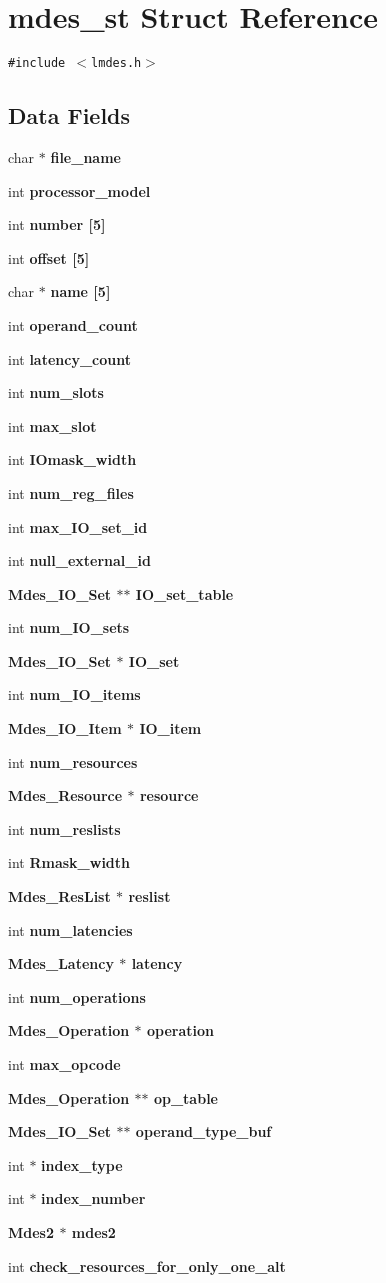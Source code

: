 \section{mdes\_\-st Struct Reference}
\label{structmdes__st}
{\tt \#include $<$lmdes.h$>$}

\subsection*{Data Fields}
\begin{CompactItemize}
\item 
char $\ast$ \bf{file\_\-name}
\item 
int \bf{processor\_\-model}
\item 
int \bf{number} [5]
\item 
int \bf{offset} [5]
\item 
char $\ast$ \bf{name} [5]
\item 
int \bf{operand\_\-count}
\item 
int \bf{latency\_\-count}
\item 
int \bf{num\_\-slots}
\item 
int \bf{max\_\-slot}
\item 
int \bf{IOmask\_\-width}
\item 
int \bf{num\_\-reg\_\-files}
\item 
int \bf{max\_\-IO\_\-set\_\-id}
\item 
int \bf{null\_\-external\_\-id}
\item 
\bf{Mdes\_\-IO\_\-Set} $\ast$$\ast$ \bf{IO\_\-set\_\-table}
\item 
int \bf{num\_\-IO\_\-sets}
\item 
\bf{Mdes\_\-IO\_\-Set} $\ast$ \bf{IO\_\-set}
\item 
int \bf{num\_\-IO\_\-items}
\item 
\bf{Mdes\_\-IO\_\-Item} $\ast$ \bf{IO\_\-item}
\item 
int \bf{num\_\-resources}
\item 
\bf{Mdes\_\-Resource} $\ast$ \bf{resource}
\item 
int \bf{num\_\-reslists}
\item 
int \bf{Rmask\_\-width}
\item 
\bf{Mdes\_\-Res\-List} $\ast$ \bf{reslist}
\item 
int \bf{num\_\-latencies}
\item 
\bf{Mdes\_\-Latency} $\ast$ \bf{latency}
\item 
int \bf{num\_\-operations}
\item 
\bf{Mdes\_\-Operation} $\ast$ \bf{operation}
\item 
int \bf{max\_\-opcode}
\item 
\bf{Mdes\_\-Operation} $\ast$$\ast$ \bf{op\_\-table}
\item 
\bf{Mdes\_\-IO\_\-Set} $\ast$$\ast$ \bf{operand\_\-type\_\-buf}
\item 
int $\ast$ \bf{index\_\-type}
\item 
int $\ast$ \bf{index\_\-number}
\item 
\bf{Mdes2} $\ast$ \bf{mdes2}
\item 
int \bf{check\_\-resources\_\-for\_\-only\_\-one\_\-alt}
\end{CompactItemize}
